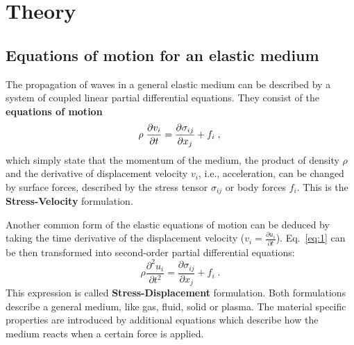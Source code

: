 \section{Theory}
\label{theory}

\subsection{Equations of motion for an elastic medium}
\label{ch:eq_motion_elastic}
The propagation of waves in a general elastic medium can be described by a system of coupled linear partial differential equations. They consist of the \textbf{equations of motion}
\begin{equation}
    \rho\;\frac{\partial v_i}{\partial t} = \frac{\partial \sigma_{ij}}{\partial x_j} + f_i\;,\\
    \label{eq:1}
\end{equation}
which simply state that the momentum of the medium, the product of density $\rho$ and the derivative of displacement velocity $v_i$, i.e., acceleration, can be changed by surface forces, described by the stress tensor $\sigma_{ij}$ or body forces $f_i$. This is the {\textbf{Stress-Velocity}} formulation. 

Another common form of the elastic equations of motion can be deduced by taking the time derivative of the displacement velocity ($v_i = \frac{\partial u_i}{\partial t}$). Eq.~\ref{eq:1} can be then transformed into second-order partial differential equations:
\begin{equation}
    \rho \frac{\partial^2 u_i}{\partial t^2} = \frac{\partial \sigma_{ij}}{\partial x_j} + f_i\;.
    \label{eq:2}
\end{equation}  
This expression is called {\textbf{Stress-Displacement}} formulation. Both formulations describe a general medium, like gas, fluid, solid or plasma. The material specific properties are introduced by additional equations which describe how the medium reacts when a certain force is applied. 

